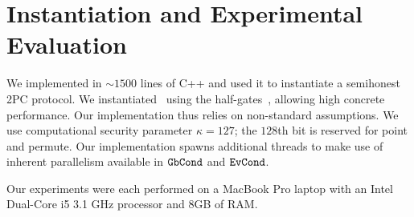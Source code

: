 \section{Instantiation and Experimental Evaluation}\label{sec:eval}

We implemented  \ourscheme in $\sim1500$ lines of C++ and used it to instantiate a semihonest 2PC protocol.
We instantiated \underscheme\ using the half-gates~\cite{EC:ZahRosEva15}, allowing high
concrete performance.
Our implementation thus relies on non-standard assumptions.
%
We use computational security parameter $\kappa=127$; the $128$th bit is reserved for point and permute.
%
Our implementation spawns additional threads to make use of inherent
parallelism available in $\mathtt{GbCond}$ and $\mathtt{EvCond}$.

Our experiments were each performed on a MacBook Pro laptop with an Intel
Dual-Core i5 3.1 GHz processor and 8GB of RAM.
%
%

